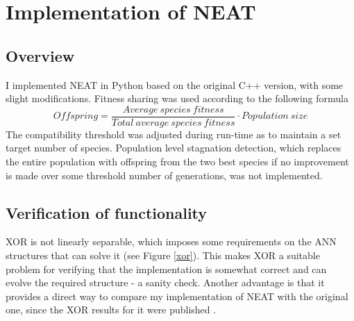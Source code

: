 \section{Implementation of NEAT}

\subsection{Overview}
I implemented NEAT in Python based on the original C++ version, with some slight modifications.
Fitness sharing was used according to the following formula
\begin{equation*} \label{eq:1}
    Offspring = \frac{Average\:species\:fitness}{Total\:average\:species\:fitness} \cdot Population\:size
\end{equation*}
The compatibility threshold was adjusted during run-time as to maintain a set target number of species.
Population level stagnation detection, which replaces the entire population with offspring from the two best species
if no improvement is made over some threshold number of generations, was not implemented.

\subsection{Verification of functionality}
XOR is not linearly separable, which imposes some requirements on the ANN structures that can solve it (see Figure \ref{xor}).
This makes XOR a suitable problem for verifying that the implementation is somewhat correct and can evolve
the required structure - a sanity check. Another advantage is that it provides a direct way to compare my
implementation of NEAT with the original one, since the XOR results for it were published \cite{neat_main}.


